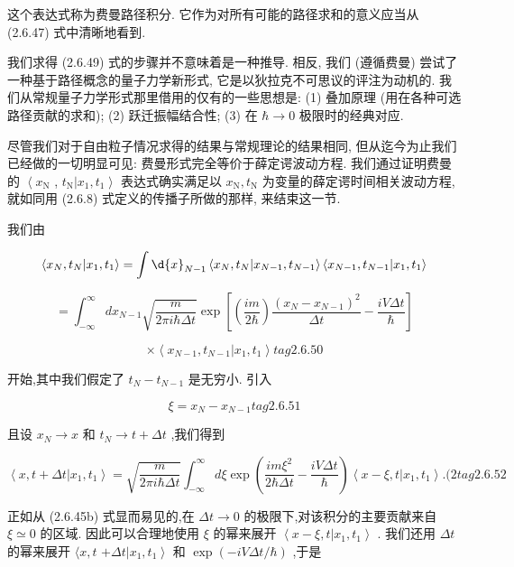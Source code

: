 \documentclass[lang=cn,newtx,10pt,scheme=chinese,thmcnt=section]{elegantbook}
\begin{document}
这个表达式称为费曼路径积分. 它作为对所有可能的路径求和的意义应当从 (2.6.47) 式中清晰地看到.

我们求得 (2.6.49) 式的步骤并不意味着是一种推导. 相反, 我们 (遵循费曼) 尝试了一种基于路径概念的量子力学新形式, 它是以狄拉克不可思议的评注为动机的. 我们从常规量子力学形式那里借用的仅有的一些思想是: (1) 叠加原理 (用在各种可选路径贡献的求和); (2) 跃迁振幅结合性; (3) 在 $\hbar \rightarrow 0$ 极限时的经典对应.

尽管我们对于自由粒子情况求得的结果与常规理论的结果相同, 但从迄今为止我们已经做的一切明显可见: 费曼形式完全等价于薛定谔波动方程. 我们通过证明费曼的 $\left\langle {x}_{\mathrm{N}}\right.$ , ${t}_{\mathrm{N}}\left| {{x}_{1},{t}_{1}}\right\rangle$ 表达式确实满足以 ${x}_{\mathrm{N}},{t}_{\mathrm{N}}$ 为变量的薛定谔时间相关波动方程,就如同用 (2.6.8) 式定义的传播子所做的那样, 来结束这一节.

我们由

$$
\left\langle {{x}_{N},{t}_{N} | {x}_{1},{t}_{1}}\right\rangle = \int \d{x}_{N - 1}\left\langle {{x}_{N},{t}_{N} | {x}_{N - 1},{t}_{N - 1}}\right\rangle \left\langle {{x}_{N - 1},{t}_{N - 1} | {x}_{1},{t}_{1}}\right\rangle
$$

$$
= {\int }_{-\infty }^{\infty }d{x}_{N - 1}\sqrt{\frac{m}{{2\pi i}\hbar {\Delta t}}}\exp \left\lbrack {\left( \frac{im}{2\hbar }\right) \frac{{\left( {x}_{N} - {x}_{N - 1}\right) }^{2}}{\Delta t} - \frac{iV\Delta t}{\hbar }}\right\rbrack
$$

$$
\times \left\langle {{x}_{N - 1},{t}_{N - 1} | {x}_{1},{t}_{1}}\right\rangle tag{2.6.50}
$$

开始,其中我们假定了 ${t}_{N} - {t}_{N - 1}$ 是无穷小. 引入

$$
\xi = {x}_{N} - {x}_{N - 1} tag{2. 6.51}
$$

且设 ${x}_{N} \rightarrow x$ 和 ${t}_{N} \rightarrow t + {\Delta t}$ ,我们得到

$$
\left\langle {x, t + {\Delta t} | {x}_{1},{t}_{1}}\right\rangle = \sqrt{\frac{m}{{2\pi i}\hbar {\Delta t}}}{\int }_{-\infty }^{\infty }{d\xi }\exp \left( {\frac{{im}{\xi }^{2}}{2\hbar {\Delta t}} - \frac{iV\Delta t}{\hbar }}\right) \left\langle {x - \xi, t | {x}_{1},{t}_{1}}\right\rangle .(2 tag{2.6.52}
$$

正如从 (2.6.45b) 式显而易见的,在 ${\Delta t} \rightarrow 0$ 的极限下,对该积分的主要贡献来自 $\xi \simeq 0$ 的区域. 因此可以合理地使用 $\xi$ 的幂来展开 $\left\langle {x - \xi, t | {x}_{1},{t}_{1}}\right\rangle$ . 我们还用 ${\Delta t}$ 的幂来展开 $\langle x, t$ $+ {\Delta t}\left| {{x}_{1},{t}_{1}}\right\rangle$ 和 $\exp \left( {-{iV\Delta t}/\hbar }\right)$ ,于是
\end{document}
